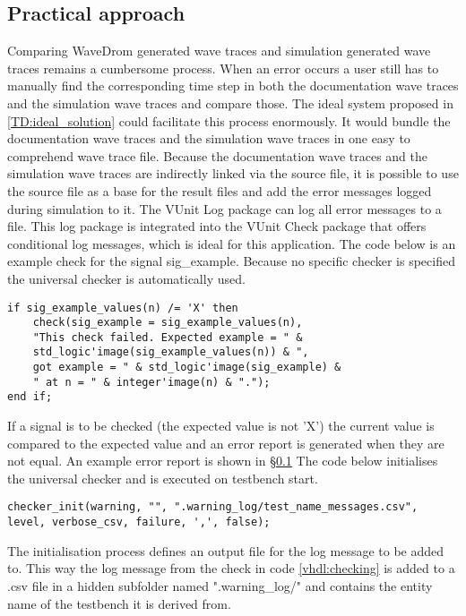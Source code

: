 \subsection{Practical approach}\label{TD:practical_approach}\label{log:error_message}
Comparing WaveDrom generated wave traces and simulation generated wave traces remains a cumbersome process. When an error occurs a user still has to manually find the corresponding time step in both the documentation wave traces and the simulation wave traces and compare those.
\npar
The ideal system proposed in \ref{TD:ideal_solution} could facilitate this process enormously. It would bundle the documentation wave traces and the simulation wave traces in one easy to comprehend wave trace file.
\npar
Because the documentation wave traces and the simulation wave traces are indirectly linked via the source file, it is possible to use the source file as a base for the result files and add the error messages logged during simulation to it. The VUnit Log package can log all error messages to a file. This log package is integrated into the VUnit Check package that offers conditional log messages, which is ideal for this application. The code below is an example check for the signal sig\_example. Because no specific checker is specified the universal checker is automatically used.
\begin{lstlisting}[style=vhdl, caption={Signal checking in VHDL}, label={vhdl:checking}]
if sig_example_values(n) /= 'X' then
	check(sig_example = sig_example_values(n),  
	"This check failed. Expected example = " &
	std_logic'image(sig_example_values(n)) & ", 
	got example = " & std_logic'image(sig_example) & 
	" at n = " & integer'image(n) & ".");
end if;
\end{lstlisting}\noindent
If a signal is to be checked (the expected value is not 'X') the current value is compared to the expected value and an error report is generated when they are not equal. An example error report is shown in §\ref{TD:practical_approach} The code below initialises the universal checker and is executed on testbench start.
\begin{lstlisting}[style=vhdl, caption={}, label={vhdl:checker_init}]
checker_init(warning, "", ".warning_log/test_name_messages.csv", level, verbose_csv, failure, ',', false);
\end{lstlisting}\noindent
The initialisation process defines an output file for the log message to be added to. This way the log message from the check in code \ref{vhdl:checking} is added to a .csv file in a hidden subfolder named ".warning\_log/" and contains the entity name of the testbench it is derived from.
